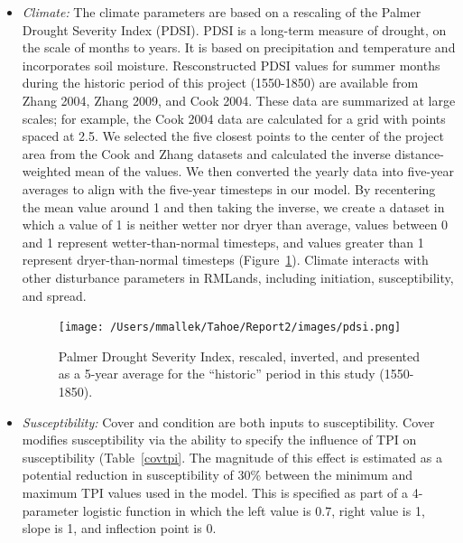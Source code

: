 \begin{itemize}
\item \emph{Climate:} The climate parameters are based on a rescaling of the Palmer Drought Severity Index (PDSI). PDSI is a long-term measure of drought, on the scale of months to years. It is based on precipitation and temperature and incorporates soil moisture. Resconstructed PDSI values for summer months during the historic period of this project (1550-1850) are available from Zhang 2004, Zhang 2009, and Cook 2004. These data are summarized at large scales; for example, the Cook 2004 data are calculated for a grid with points spaced at 2.5\textdegree. We selected the five closest points to the center of the project area from the Cook and Zhang datasets and calculated the inverse distance-weighted mean of the values. We then converted the yearly data into five-year averages to align with the five-year timesteps in our model. By recentering the mean value around 1 and then taking the inverse, we create a dataset in which a value of 1 is neither wetter nor dryer than average, values between 0 and 1 represent wetter-than-normal timesteps, and values greater than 1 represent dryer-than-normal timesteps (Figure~\ref{pdsi}). Climate interacts with other disturbance parameters in RMLands, including initiation, susceptibility, and spread.

\begin{figure}[htbp]
\centering
\texttt{[image: /Users/mmallek/Tahoe/Report2/images/pdsi.png]}
\caption{Palmer Drought Severity Index, rescaled, inverted, and presented as a 5-year average for the ``historic'' period in this study (1550-1850).} 
\label{pdsi}
\end{figure}


\item \emph{Susceptibility:} Cover and condition are both inputs to susceptibility. Cover modifies susceptibility via the ability to specify the influence of TPI on susceptibility (Table~\ref{covtpi}. The magnitude of this effect is estimated as a potential reduction in susceptibility of 30\% between the minimum and maximum TPI values used in the model. This is specified as part of a 4-parameter logistic function in which the left value is 0.7, right value is 1, slope is 1, and inflection point is 0. 


\end{itemize}
